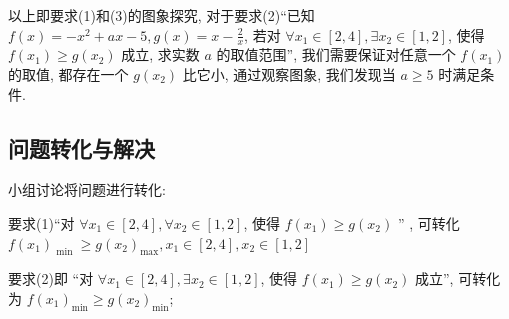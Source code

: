 以上即要求(1)和(3)的图象探究, 对于要求(2)“已知 \(f(x)  =  - {x}^{2} + {ax} - 5, g(x)  = x - \frac{2}{x}\), 若对 \(\forall {x}_{1} \in  \left\lbrack  {2, 4}\right\rbrack  , \exists {x}_{2} \in  \left\lbrack  {1, 2}\right\rbrack\), 使得 \(f\left( {x}_{1}\right)  \geq  g\left( {x}_{2}\right)\) 成立, 求实数 \(a\) 的取值范围”, 我们需要保证对任意一个 \(f\left( {x}_{1}\right)\) 的取值, 都存在一个 \(g\left( {x}_{2}\right)\) 比它小, 通过观察图象, 我们发现当 \(a \geq  5\) 时满足条件.







\subsection{问题转化与解决}
小组讨论将问题进行转化:

要求(1)“对 \(\forall {x}_{1} \in  \left\lbrack  {2, 4}\right\rbrack  , \forall {x}_{2} \in  \left\lbrack  {1, 2}\right\rbrack\), 使得 \(f\left( {x}_{1}\right)  \geq  g\left( {x}_{2}\right)\) ” , 可转化 \(f{\left( {x}_{1}\right) }_{\text{ min }} \geq g{\left( {x}_{2}\right) }_{\max }, {x}_{1} \in  \left\lbrack  {2, 4}\right\rbrack  , {x}_{2} \in  \left\lbrack  {1, 2}\right\rbrack\)

要求(2)即 “对 \(\forall {x}_{1} \in  \left\lbrack  {2, 4}\right\rbrack  , \exists {x}_{2} \in  \left\lbrack  {1, 2}\right\rbrack\), 使得 \(f\left( {x}_{1}\right)  \geq  g\left( {x}_{2}\right)\) 成立”, 可转化为 \(f{\left( {x}_{1}\right) }_{\min } \geq  g{\left( {x}_{2}\right) }_{\min }\);

